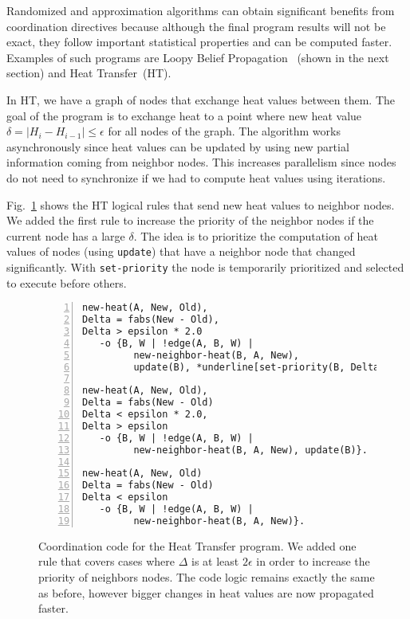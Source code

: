 Randomized and approximation
algorithms can obtain significant benefits from coordination directives because although the final
program results will not be exact, they follow important statistical properties and can be computed faster.
Examples of such programs are Loopy Belief
Propagation~\cite{Gonzalez+al:aistats09paraml} (shown in the next section) and
Heat Transfer~(HT).

In HT, we have a graph of nodes that exchange heat values between them. The goal
of the program is to exchange heat to a point where new heat value $\delta = |H_i -
H_{i-1}| \le \epsilon$ for all nodes of the graph. The algorithm works
asynchronously since heat values can be updated by using new partial information
coming from neighbor nodes. This increases parallelism since nodes do not need
to synchronize if we had to compute heat values using iterations.

Fig.~\ref{code:ht} shows the HT logical rules that send new heat values to
neighbor nodes. We added the first rule to increase the priority of the neighbor
nodes if the current node has a large $\delta$. The idea is to prioritize the
computation of heat values of nodes (using \texttt{update}) that have a neighbor
node that changed significantly. With \texttt{set-priority} the node is
temporarily prioritized and selected to execute before others.

\begin{figure}[h!]
\scriptsize\begin{Verbatim}[numbers=left,commandchars=*\[\]]
new-heat(A, New, Old),
Delta = fabs(New - Old),
Delta > epsilon * 2.0
   -o {B, W | !edge(A, B, W) |
         new-neighbor-heat(B, A, New),
         update(B), *underline[set-priority(B, Delta)]}.

new-heat(A, New, Old),
Delta = fabs(New - Old)
Delta < epsilon * 2.0,
Delta > epsilon
   -o {B, W | !edge(A, B, W) |
         new-neighbor-heat(B, A, New), update(B)}.

new-heat(A, New, Old)
Delta = fabs(New - Old)
Delta < epsilon
   -o {B, W | !edge(A, B, W) |
         new-neighbor-heat(B, A, New)}.
\end{Verbatim}
  \caption{Coordination code for the Heat Transfer program. We added one rule
     that covers cases where $\Delta$ is at least $2 \epsilon$ in order to
     increase the priority of neighbors nodes. The code logic remains exactly
     the same as before, however bigger changes in heat values are now
     propagated faster.}
  \label{code:ht}
\end{figure}
\normalsize
